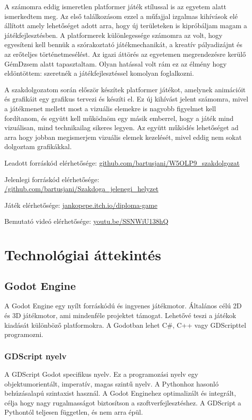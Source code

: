\documentclass[
]{thesis-ekf}
\theoremstyle{definition}
\theoremstyle{remark}
\begin{document}
A számomra eddig ismeretlen platformer játék stílussal is az egyetem alatt ismerkedtem meg. Az első találkozásom ezzel a műfajjal izgalmas kihívások elé állított amely lehetőséget adott arra, hogy új területeken is kipróbáljam magam a játékfejlesztésben. A platformerek különlegessége számomra az volt, hogy egyesíteni kell bennük a szórakoztató játékmechanikát, a kreatív pályadizájnt és az erőteljes történetmesélést. Az igazi áttörés az egyetemen megrendezésre kerülő GémDzsem alatt tapasztaltam. Olyan hatással volt rám ez az élmény hogy eldöntöttem: szeretnék a játékfejlesztéssel komolyan foglalkozni.

A szakdolgozatom során először készítek platformer játékot, amelynek animációit és grafikáit  egy grafikus tervezi és készíti el. Ez új kihívást jelent számomra, mivel a játékmenet mellett most a vizuális elemekre is nagyobb figyelmet kell fordítanom, és együtt kell működnöm egy másik emberrel, hogy a játék mind vizuálisan, mind technikailag sikeres legyen. Az együtt működés lehetőséget ad arra hogy jobban megismerjem vizuális elemek kezelését, mivel eddig nem sokat dolgoztam grafikákkal.


Leadott forráskód elérhetősége:
\href{https://github.com/bartusjani/W5OLP9_szakdolgozat}{github.com/bartusjani/W5OLP9\_szakdolgozat}

Jelenlegi forráskód elérhetősége: \href{https://github.com/bartusjani/Szakdoga_jelenegi_helyzet}{/github.com/bartusjani/Szakdoga\_jelenegi\_helyzet}

Játék elérhetősége: \href{https://jankopepe.itch.io/diploma-game}{jankopepe.itch.io/diploma-game}

Bemutató videó elérhetősége: \href{https://youtu.be/SSNWiU138hQ}{youtu.be/SSNWiU138hQ}


\chapter{Technológiai áttekintés}

\section{Godot Engine}

A Godot Engine egy nyílt forráskódú és ingyenes játékmotor. Általános célú 2D és 3D játékmotor, ami mindenféle projektet támogat. Lehetővé teszi a játékok kiadását különböző platformokra. A Godotban lehet C\#, C++ vagy GDScripttel programozni.
\subsection{GDScript nyelv}
A GDScript Godot specifikus nyelv. Ez a programozási nyelv egy objektumorientált, imperatív, magas szintű nyelv. A Pythonhoz hasonló behúzásalapú szintaxist használ. A Godot Enginehez optimalizált és integrált, célja hogy nagy rugalmasságot biztosítson a szoftverfejlesztéshez. A GDScript a Pythontól  teljesen független, és nem arra épül.
\end{document}
